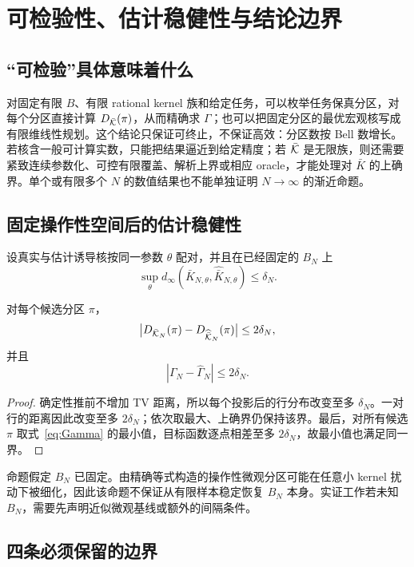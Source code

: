 \section{可检验性、估计稳健性与结论边界}
\label{sec:verification}

\subsection{“可检验”具体意味着什么}

对固定有限 $B$、有限 rational kernel 族和给定任务，可以枚举任务保真分区，对每个分区直接计算 $D_{\bar{\mathcal K}}(\pi)$，从而精确求 $\Gamma$；也可以把固定分区的最优宏观核写成有限维线性规划。这个结论只保证可终止，不保证高效：分区数按 Bell 数增长。若核含一般可计算实数，只能把结果逼近到给定精度；若 $\bar{\mathcal K}$ 是无限族，则还需要紧致连续参数化、可控有限覆盖、解析上界或相应 oracle，才能处理对 $\bar K$ 的上确界。单个或有限多个 $N$ 的数值结果也不能单独证明 $N\to\infty$ 的渐近命题。

\subsection{固定操作性空间后的估计稳健性}

设真实与估计诱导核按同一参数 $\theta$ 配对，并且在已经固定的 $B_N$ 上
\[
\sup_\theta d_\infty(\bar K_{N,\theta},\widehat{\bar K}_{N,\theta})
\le\delta_N.
\]

\begin{proposition}[证书扰动界]
\label{prop:estimation-robustness}
对每个候选分区 $\pi$，
\[
\bigl|D_{\bar{\mathcal K}_N}(\pi)-D_{\widehat{\bar{\mathcal K}}_N}(\pi)\bigr|
\le2\delta_N,
\]
并且
\[
|\Gamma_N-\widehat\Gamma_N|\le2\delta_N.
\]
\end{proposition}

\begin{proof}
确定性推前不增加 TV 距离，所以每个投影后的行分布改变至多 $\delta_N$。一对行的距离因此改变至多 $2\delta_N$；依次取最大、上确界仍保持该界。最后，对所有候选 $\pi$ 取式~\eqref{eq:Gamma} 的最小值，目标函数逐点相差至多 $2\delta_N$，故最小值也满足同一界。
\end{proof}

命题假定 $B_N$ 已固定。由精确等式构造的操作性微观分区可能在任意小 kernel 扰动下被细化，因此该命题不保证从有限样本稳定恢复 $B_N$ 本身。实证工作若未知 $B_N$，需要先声明近似微观基线或额外的间隔条件。

\subsection{四条必须保留的边界}

